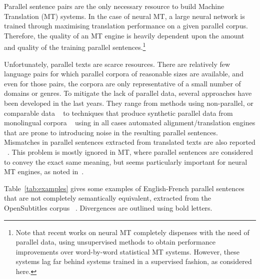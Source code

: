 \documentclass[11pt,a4paper]{article}
\begin{document}
Parallel sentence pairs are the only necessary resource to build Machine Translation (MT) systems.
In the case of neural MT, a large neural network is trained through maximising translation performance on a given parallel corpus. 
Therefore, the quality of an MT engine is heavily dependent upon the
amount and quality of the training parallel sentences.\footnote{Note
  that recent works on neural MT
  \cite{lample2018word,artetxe2018iclr} completely dispenses with the
  need of parallel data, using unsupervised methods to obtain performance
  improvements over word-by-word statistical MT systems. However, these systems
  lag far behind systems trained in a supervised fashion, as
  considered here.} 

Unfortunately, parallel texts are scarce resources. 
There are relatively few language pairs for which parallel corpora of
reasonable sizes are available, and even for those pairs, the corpora
are only representative of a small number of domains or genres. 
To mitigate the lack of parallel data, several approaches have been developed in the last years.
They range from methods using non-parallel, or comparable data ~\cite{Zhao:2002:APS:844380.844785,W04-3208,J05-4003,W17-2509,P17-3003,P18-2037} to techniques that produce synthetic parallel data from monolingual corpora ~\cite{P16-1009,W17-4714} using in all cases automated alignment/translation engines that are prone to introducing noise in the resulting parallel sentences. 
Mismatches in parallel sentences extracted from translated texts are also reported ~\cite{tiedemann2011bitext,XU16.310}. 
This problem is mostly ignored in MT, where parallel sentences are considered to convey the exact same meaning, but seems particularly important for neural MT engines, as noted in~\citet{chen2016adaptation}.

Table~\ref{tab:examples} gives some examples of English-French
parallel sentences that are not completely semantically equivalent, 
extracted from the OpenSubtitles corpus ~\cite{LisonTiedemann2016}. 
Divergences are outlined using bold letters. 
\end{document}
